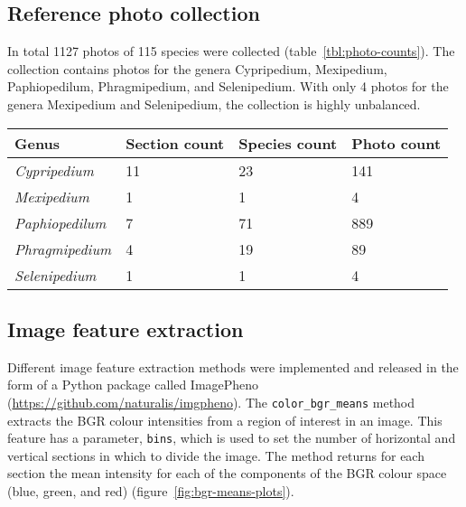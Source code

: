 \documentclass[review,3p,twocolumn]{elsarticle}
\begin{document}
\subsection{Reference photo collection}

In total 1127 photos of 115 species were collected (table~\ref{tbl:photo-counts}). The collection contains photos for the genera Cypripedium, Mexipedium, Paphiopedilum, Phragmipedium, and Selenipedium. With only 4 photos for the genera Mexipedium and Selenipedium, the collection is highly unbalanced.

\begin{table*}[t]\footnotesize
    \caption{The number of photos collected per genus, as well as the number of sections and species per genus represented by the photo collection. A total of 1127 photos of 115 species were collected.}
    \begin{center}
    \begin{tabular}{llll}
    \toprule
    \textbf{Genus} & \textbf{Section count} & \textbf{Species count} & \textbf{Photo count} \\
    \midrule
    \textit{Cypripedium} & 11 & 23 & 141 \\
    \textit{Mexipedium} & 1 & 1 & 4 \\
    \textit{Paphiopedilum} & 7 & 71 & 889 \\
    \textit{Phragmipedium} & 4 & 19 & 89 \\
    \textit{Selenipedium} & 1 & 1 & 4 \\
    \bottomrule
    \end{tabular}
    \end{center}
    \label{tbl:photo-counts}
\end{table*}

\subsection{Image feature extraction}

Different image feature extraction methods were implemented and released in the form of a Python package called ImagePheno (\url{https://github.com/naturalis/imgpheno}). The \verb/color_bgr_means/ method extracts the BGR colour intensities from a region of interest in an image. This feature has a parameter, \verb/bins/, which is used to set the number of horizontal and vertical sections in which to divide the image. The method returns for each section the mean intensity for each of the components of the BGR colour space (blue, green, and red) (figure~\ref{fig:bgr-means-plots}).
\end{document}
